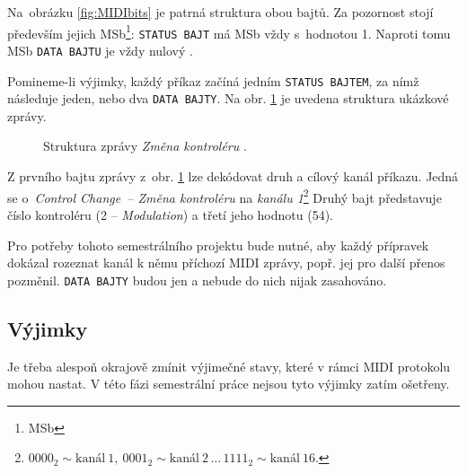 Na~obrázku \ref{fig:MIDIbits} je patrná struktura obou bajtů. Za pozornost stojí především jejich \acs{MSb}\footnote{\acl{MSb}}: \texttt{STATUS~BAJT} má \acs{MSb} vždy s~hodnotou 1. Naproti tomu \acs{MSb} \texttt{DATA BAJTU} je vždy nulový  \cite{vkMIDI}.

Pomineme-li výjimky, každý příkaz začíná jedním \texttt{STATUS BAJTEM}, za nímž následuje jeden, nebo dva \texttt{DATA BAJTY}. Na obr. \ref{fig:MIDImsg} je uvedena struktura ukázkové zprávy.

\begin{figure}[h]
    \centering
    \caption{Struktura zprávy \emph{Změna kontroléru} \cite{MIDIspecs}.}
    \label{fig:MIDImsg}
\end{figure}

Z prvního bajtu zprávy z~obr. \ref{fig:MIDImsg} lze dekódovat druh a cílový kanál příkazu. Jedná se o~\emph{Control Change~-- Změna kontroléru} na \emph{kanálu 1}\footnote{$0000_2 \sim \mathrm{kanál\ 1,\ } 0001_2 \sim \mathrm{kanál\ 2}\,\ldots\,1111_2\sim\mathrm{kanál\ 16}$.} Druhý bajt představuje číslo kontroléru (2 -- \emph{Modulation}) a třetí jeho hodnotu (54).

Pro potřeby tohoto semestrálního projektu bude nutné, aby každý přípravek dokázal rozeznat kanál k němu příchozí \acs{MIDI} zprávy, popř. jej pro další přenos pozměnil. \texttt{DATA~BAJTY} budou jen  a nebude do nich nijak zasahováno.

\subsection{Výjimky}\label{chpt:MIDIexcs}
Je třeba alespoň okrajově zmínit výjimečné stavy, které v rámci \acs{MIDI} protokolu mohou nastat. V této fázi semestrální práce nejsou tyto výjimky zatím ošetřeny.

